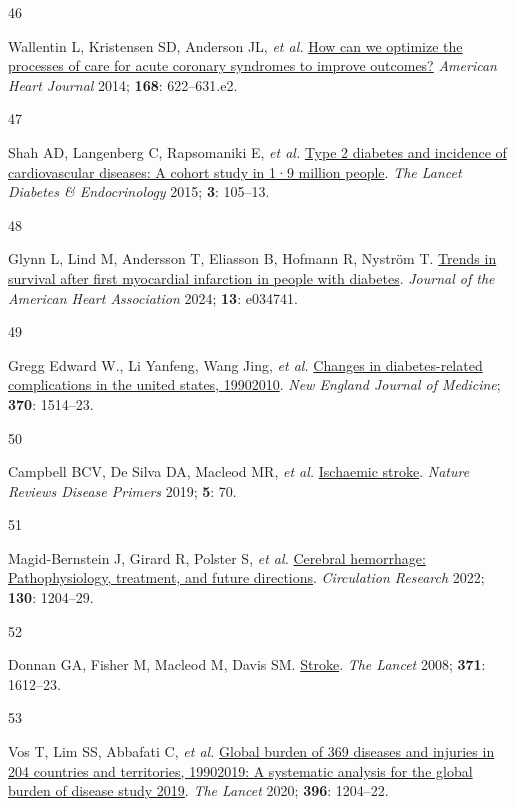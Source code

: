 \documentclass[
  letterpaper,
  headsepline=true,
  open=any]{scrbook}
\newlength{\cslhangindent}
\newlength{\csllabelwidth}
\newlength{\cslentryspacingunit} %
\newenvironment{CSLReferences}[2] %
 {%
  \setlength{\parindent}{0pt}
  \ifodd #1
  \let\oldpar\par
  \def\par{\hangindent=\cslhangindent\oldpar}
  \fi
  \setlength{\parskip}{#2\cslentryspacingunit}
 }%
 {}
\newcommand{\CSLLeftMargin}[1]{\parbox[t]{\csllabelwidth}{#1}}
\newcommand{\CSLRightInline}[1]{\parbox[t]{\linewidth - \csllabelwidth}{#1}\break}
\begin{document}
\begin{CSLReferences}{0}{0}
\leavevmode{}%
\CSLLeftMargin{46 }%
\CSLRightInline{Wallentin L, Kristensen SD, Anderson JL, \emph{et al.}
\href{https://doi.org/10.1016/j.ahj.2014.07.006}{How can we optimize the
processes of care for acute coronary syndromes to improve outcomes?}
\emph{American Heart Journal} 2014; \textbf{168}: 622--631.e2.}

\leavevmode{}%
\CSLLeftMargin{47 }%
\CSLRightInline{Shah AD, Langenberg C, Rapsomaniki E, \emph{et al.}
\href{https://doi.org/10.1016/S2213-8587(14)70219-0}{Type 2 diabetes and
incidence of cardiovascular diseases: A cohort study in 1·9 million
people}. \emph{The Lancet Diabetes \& Endocrinology} 2015; \textbf{3}:
105--13.}

\leavevmode{}%
\CSLLeftMargin{48 }%
\CSLRightInline{Glynn L, Lind M, Andersson T, Eliasson B, Hofmann R,
Nyström T. \href{https://doi.org/10.1161/JAHA.123.034741}{Trends in
survival after first myocardial infarction in people with diabetes}.
\emph{Journal of the American Heart Association} 2024; \textbf{13}:
e034741.}

\leavevmode{}%
\CSLLeftMargin{49 }%
\CSLRightInline{Gregg Edward W., Li Yanfeng, Wang Jing, \emph{et al.}
\href{https://doi.org/10.1056/NEJMoa1310799}{Changes in diabetes-related
complications in the united states, 1990{\textendash}2010}. \emph{New
England Journal of Medicine}; \textbf{370}: 1514--23.}

\leavevmode{}%
\CSLLeftMargin{50 }%
\CSLRightInline{Campbell BCV, De Silva DA, Macleod MR, \emph{et al.}
\href{https://doi.org/10.1038/s41572-019-0118-8}{Ischaemic stroke}.
\emph{Nature Reviews Disease Primers} 2019; \textbf{5}: 70.}

\leavevmode{}%
\CSLLeftMargin{51 }%
\CSLRightInline{Magid-Bernstein J, Girard R, Polster S, \emph{et al.}
\href{https://doi.org/10.1161/CIRCRESAHA.121.319949}{Cerebral
hemorrhage: Pathophysiology, treatment, and future directions}.
\emph{Circulation Research} 2022; \textbf{130}: 1204--29.}

\leavevmode{}%
\CSLLeftMargin{52 }%
\CSLRightInline{Donnan GA, Fisher M, Macleod M, Davis SM.
\href{https://doi.org/10.1016/S0140-6736(08)60694-7}{Stroke}. \emph{The
Lancet} 2008; \textbf{371}: 1612--23.}

\leavevmode{}%
\CSLLeftMargin{53 }%
\CSLRightInline{Vos T, Lim SS, Abbafati C, \emph{et al.}
\href{https://doi.org/10.1016/S0140-6736(20)30925-9}{Global burden of
369 diseases and injuries in 204 countries and territories,
1990{\textendash}2019: A systematic analysis for the global burden of
disease study 2019}. \emph{The Lancet} 2020; \textbf{396}: 1204--22.}


\end{CSLReferences}
\end{document}

